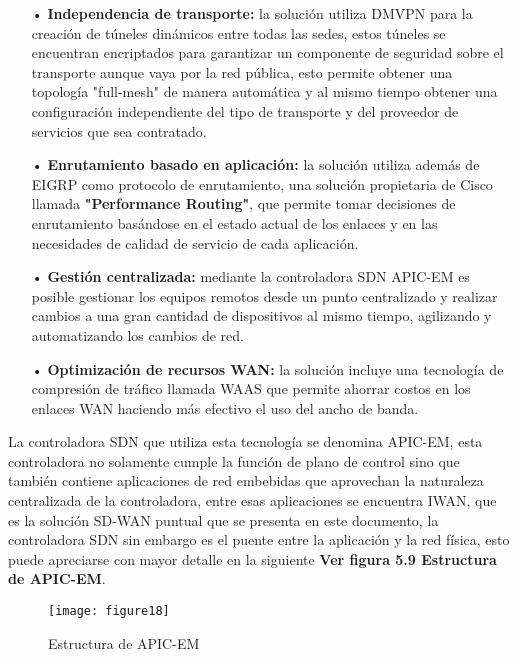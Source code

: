 \begin{itemize}
\item[•]\textbf{Independencia de transporte:} la solución utiliza DMVPN para la creación de túneles dinámicos entre todas las sedes, estos túneles se encuentran encriptados para garantizar un componente de seguridad sobre el transporte aunque vaya por la red pública, esto permite obtener una topología "full-mesh" de manera automática y al mismo tiempo obtener una configuración independiente del tipo de transporte y del proveedor de servicios que sea contratado.
\item[•]\textbf{Enrutamiento basado en aplicación:} la solución utiliza además de EIGRP como protocolo de enrutamiento, una solución propietaria de Cisco llamada \textbf{"Performance Routing"}, que permite tomar decisiones de enrutamiento basándose en el estado actual de los enlaces y en las necesidades de calidad de servicio de cada aplicación.
\item[•]\textbf{Gestión centralizada:} mediante la controladora SDN APIC-EM es posible gestionar los equipos remotos desde un punto centralizado y realizar cambios a una gran cantidad de dispositivos al mismo tiempo, agilizando y automatizando los cambios de red.
\item[•]\textbf{Optimización de recursos WAN:} la solución incluye una tecnología de compresión de tráfico llamada WAAS que permite ahorrar costos en los enlaces WAN haciendo más efectivo el uso del ancho de banda.
\end{itemize}

La controladora SDN que utiliza esta tecnología se denomina APIC-EM, esta controladora no solamente cumple la función de plano de control sino que también contiene aplicaciones de red embebidas que aprovechan la naturaleza centralizada de la controladora, entre esas aplicaciones se encuentra IWAN, que es la solución SD-WAN puntual que se presenta en este documento, la controladora SDN sin embargo es el puente entre la aplicación y la red física, esto puede apreciarse con mayor detalle en la siguiente \textbf{Ver figura 5.9 Estructura de APIC-EM}.


\begin{figure}[htbp]
  \centering
    {\texttt{[image: figure18]}}%
  \caption{Estructura de APIC-EM}
  \label{fig:fig2subfig}
\end{figure}

